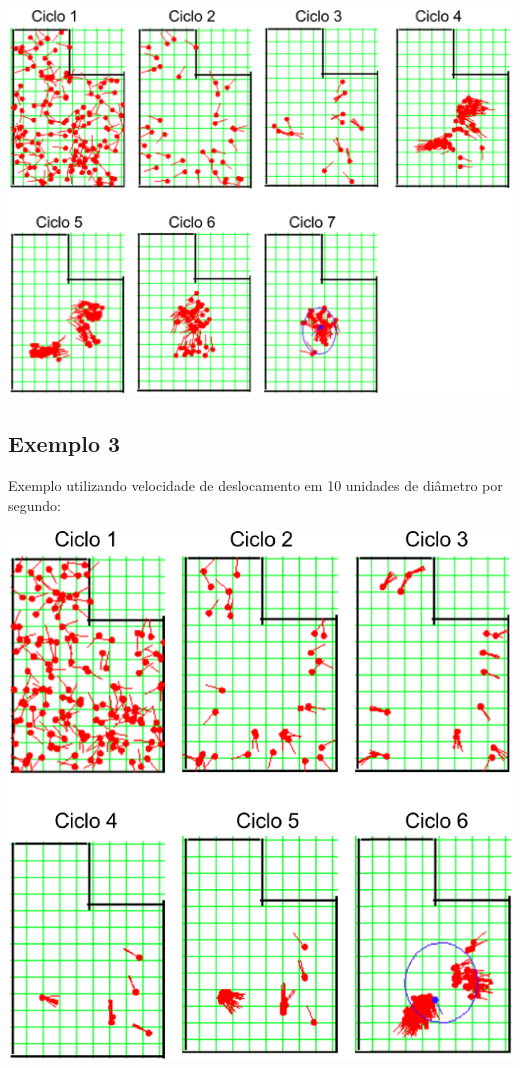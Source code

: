 {\centering
\includegraphics[scale=0.4]{figuras/cen3_ex2.eps}
\label{img:cen3_ex2}
\par}


\subsection{Exemplo 3}

Exemplo utilizando velocidade de deslocamento em 10 unidades de diâmetro por segundo:

{\centering
\includegraphics[scale=0.4]{figuras/cen3_ex3.eps}
\label{img:cen3_ex3}
\par}

